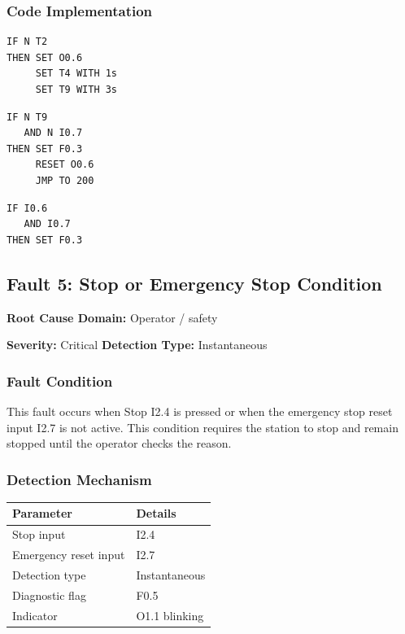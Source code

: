 \subsubsection{Code Implementation}

\begin{verbatim}
IF N T2
THEN SET O0.6
     SET T4 WITH 1s
     SET T9 WITH 3s
\end{verbatim}

\begin{verbatim}
IF N T9
   AND N I0.7
THEN SET F0.3
     RESET O0.6
     JMP TO 200
\end{verbatim}

\begin{verbatim}
IF I0.6
   AND I0.7
THEN SET F0.3
\end{verbatim}

\subsection{Fault 5: Stop or Emergency Stop Condition}

\textbf{Root Cause Domain:} Operator / safety

\textbf{Severity:} Critical \quad \textbf{Detection Type:} Instantaneous

\subsubsection{Fault Condition}

This fault occurs when Stop I2.4 is pressed or when the emergency stop reset input I2.7 is not active. This condition requires the station to stop and remain stopped until the operator checks the reason.

\subsubsection{Detection Mechanism}

\begin{longtable}{|p{3.6cm}|p{9.2cm}|}
\hline
Parameter & Details \\
\hline
Stop input & I2.4 \\
\hline
Emergency reset input & I2.7 \\
\hline
Detection type & Instantaneous \\
\hline
Diagnostic flag & F0.5 \\
\hline
Indicator & O1.1 blinking \\
\hline
\end{longtable}

